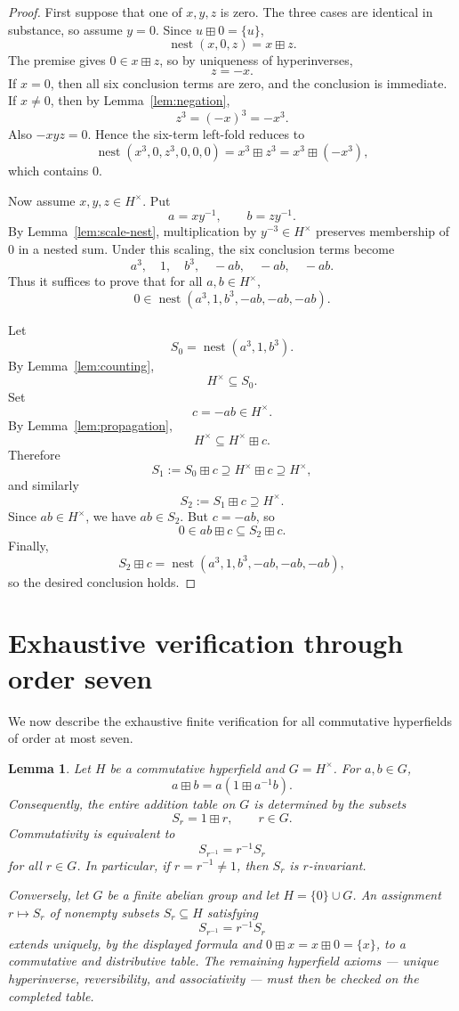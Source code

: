 \documentclass[12pt]{article}
\newtheorem{lemma}[theorem]{Lemma}
\theoremstyle{definition}
\theoremstyle{remark}
\numberwithin{equation}{section}
\newcommand{\nest}{\operatorname{nest}}
\begin{document}
\begin{proof}
First suppose that one of \(x,y,z\) is zero. The three cases are identical in substance, so assume \(y=0\). Since \(u\boxplus0=\{u\}\),
\[
\nest(x,0,z)=x\boxplus z.
\]
The premise gives \(0\in x\boxplus z\), so by uniqueness of hyperinverses,
\[
z=-x.
\]
If \(x=0\), then all six conclusion terms are zero, and the conclusion is immediate. If \(x\neq0\), then by Lemma~\ref{lem:negation},
\[
z^3=(-x)^3=-x^3.
\]
Also \(-xyz=0\). Hence the six-term left-fold reduces to
\[
\nest(x^3,0,z^3,0,0,0)=x^3\boxplus z^3=x^3\boxplus(-x^3),
\]
which contains \(0\).

Now assume \(x,y,z\in H^\times\). Put
\[
a=xy^{-1},\qquad b=zy^{-1}.
\]
By Lemma~\ref{lem:scale-nest}, multiplication by \(y^{-3}\in H^\times\) preserves membership of \(0\) in a nested sum. Under this scaling, the six conclusion terms become
\[
a^3,\quad 1,\quad b^3,\quad -ab,\quad -ab,\quad -ab.
\]
Thus it suffices to prove that for all \(a,b\in H^\times\),
\[
0\in\nest(a^3,1,b^3,-ab,-ab,-ab).
\]

Let
\[
S_0=\nest(a^3,1,b^3).
\]
By Lemma~\ref{lem:counting},
\[
H^\times\subseteq S_0.
\]
Set
\[
c=-ab\in H^\times.
\]
By Lemma~\ref{lem:propagation},
\[
H^\times\subseteq H^\times\boxplus c.
\]
Therefore
\[
S_1:=S_0\boxplus c\supseteq H^\times\boxplus c\supseteq H^\times,
\]
and similarly
\[
S_2:=S_1\boxplus c\supseteq H^\times.
\]
Since \(ab\in H^\times\), we have \(ab\in S_2\). But \(c=-ab\), so
\[
0\in ab\boxplus c\subseteq S_2\boxplus c.
\]
Finally,
\[
S_2\boxplus c=\nest(a^3,1,b^3,-ab,-ab,-ab),
\]
so the desired conclusion holds.
\end{proof}

\section{Exhaustive verification through order seven}\label{sec:small}

We now describe the exhaustive finite verification for all commutative hyperfields of order at most seven.

\begin{lemma}\label{lem:normal-form}
Let \(H\) be a commutative hyperfield and \(G=H^\times\). For \(a,b\in G\),
\[
a\boxplus b=a(1\boxplus a^{-1}b).
\]
Consequently, the entire addition table on \(G\) is determined by the subsets
\[
S_r=1\boxplus r,\qquad r\in G.
\]
Commutativity is equivalent to
\[
S_{r^{-1}}=r^{-1}S_r
\]
for all \(r\in G\). In particular, if \(r=r^{-1}\neq1\), then \(S_r\) is \(r\)-invariant.

Conversely, let \(G\) be a finite abelian group and let \(H=\{0\}\cup G\). An assignment \(r\mapsto S_r\) of nonempty subsets \(S_r\subseteq H\) satisfying
\[
S_{r^{-1}}=r^{-1}S_r
\]
extends uniquely, by the displayed formula and \(0\boxplus x=x\boxplus0=\{x\}\), to a commutative and distributive table. The remaining hyperfield axioms --- unique hyperinverse, reversibility, and associativity --- must then be checked on the completed table.
\end{lemma}
\end{document}
